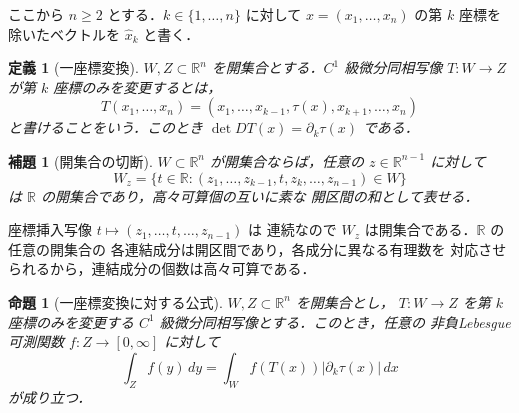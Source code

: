 \documentclass[a5paper,10pt,onecolumn]{jsarticle}
\makeatletter
\theoremstyle{mathnotetheorem}
\newtheorem{definition}[theorem]{定義}
\newtheorem{lemma}[theorem]{補題}
\newtheorem{proposition}[theorem]{命題}
\renewcommand{\proofname}{証明}
\renewenvironment{proof}[1][\proofname]{%
  \par\pushQED{\qed}\normalfont\topsep4\p@\@plus2\p@\relax
  \trivlist\item[\hskip\labelsep\bfseries #1]\ignorespaces
}{\popQED\endtrivlist\@endpefalse}
\newcommand{\R}{\mathbb{R}}
\newcommand{\abs}[1]{\lvert #1\rvert}
\makeatother
\begin{document}
ここから $n\ge2$ とする．$k\in\{1,\ldots,n\}$ に対して
$x=(x_1,\ldots,x_n)$ の第 $k$ 座標を除いたベクトルを
$\widehat x_k$ と書く．

\begin{definition}[一座標変換]
$W,Z\subset\R^n$ を開集合とする．$C^1$ 級微分同相写像
$T:W\to Z$ が第 $k$ 座標のみを変更するとは，
\[
 T(x_1,\ldots,x_n)
 =(x_1,\ldots,x_{k-1},\tau(x),x_{k+1},\ldots,x_n)
\]
と書けることをいう．このとき
$\det DT(x)=\partial_k\tau(x)$ である．
\end{definition}

\begin{lemma}[開集合の切断]\label{lem:slices}
$W\subset\R^n$ が開集合ならば，任意の
$z\in\R^{n-1}$ に対して
\[
 W_z=\{t\in\R:(z_1,\ldots,z_{k-1},t,z_k,\ldots,z_{n-1})\in W\}
\]
は $\R$ の開集合であり，高々可算個の互いに素な
開区間の和として表せる．
\end{lemma}

\begin{proof}
座標挿入写像 $t\mapsto(z_1,\ldots,t,\ldots,z_{n-1})$ は
連続なので $W_z$ は開集合である．$\R$ の任意の開集合の
各連結成分は開区間であり，各成分に異なる有理数を
対応させられるから，連結成分の個数は高々可算である．
\end{proof}

\begin{proposition}[一座標変換に対する公式]\label{prop:coordinate}
$W,Z\subset\R^n$ を開集合とし，
$T:W\to Z$ を第 $k$ 座標のみを変更する
$C^1$ 級微分同相写像とする．このとき，任意の
非負Lebesgue可測関数 $f:Z\to[0,\infty]$ に対して
\begin{equation}\label{eq:coordinate}
 \int_Z f(y)\,dy
 =\int_W f(T(x))\abs{\partial_k\tau(x)}\,dx
\end{equation}
が成り立つ．
\end{proposition}
\end{document}
